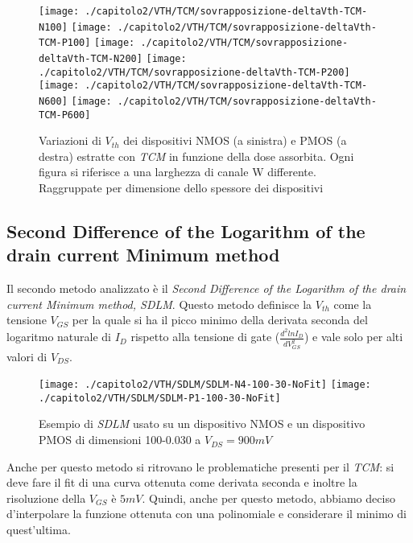 \begin{figure}[H]
  \centering
  \texttt{[image: ./capitolo2/VTH/TCM/sovrapposizione-deltaVth-TCM-N100]}
  \texttt{[image: ./capitolo2/VTH/TCM/sovrapposizione-deltaVth-TCM-P100]}
  \texttt{[image: ./capitolo2/VTH/TCM/sovrapposizione-deltaVth-TCM-N200]}
  \texttt{[image: ./capitolo2/VTH/TCM/sovrapposizione-deltaVth-TCM-P200]}
  \texttt{[image: ./capitolo2/VTH/TCM/sovrapposizione-deltaVth-TCM-N600]}
  \texttt{[image: ./capitolo2/VTH/TCM/sovrapposizione-deltaVth-TCM-P600]}

  \caption[Dati $\Delta V_{th}$ estratti con TCM]{Variazioni di $V_{th}$ dei dispositivi NMOS (a sinistra) e PMOS (a destra) estratte con \emph{TCM} in funzione della dose assorbita. Ogni figura si riferisce a una larghezza di canale W differente. Raggruppate per dimensione dello spessore dei dispositivi}
  \label{fig:deltaVthTCM}
\end{figure}

\subsection[SDLM]{Second Difference of the Logarithm of the drain current Minimum method}
Il secondo metodo analizzato è il \emph{Second Difference of the Logarithm of the drain current Minimum method, SDLM}. Questo metodo definisce la $V_{th}$ come la tensione $V_{GS}$ per la quale si ha il picco minimo della derivata seconda del logaritmo naturale di $I_D$ rispetto alla tensione di gate ($\frac{d^2lnI_D}{dV_{GS}^2}$) e vale solo per alti valori di $V_{DS}$\cite{art1}.


\begin{figure}[H]
  \centering
  \texttt{[image: ./capitolo2/VTH/SDLM/SDLM-N4-100-30-NoFit]}
  \texttt{[image: ./capitolo2/VTH/SDLM/SDLM-P1-100-30-NoFit]}
  \caption[Applicazione SDLM senza fit polinomiale]{Esempio di \emph{SDLM} usato su un dispositivo NMOS e un dispositivo PMOS di dimensioni 100-0.030 a $V_{DS} = 900 mV$}
\end{figure}

Anche per questo metodo si ritrovano le problematiche presenti per il \emph{TCM}: si deve fare il fit di una curva ottenuta come derivata seconda e inoltre la risoluzione della $V_{GS}$ è $5mV$.
Quindi, anche per questo metodo, abbiamo deciso d'interpolare la funzione ottenuta con una polinomiale e considerare il minimo di quest'ultima.

